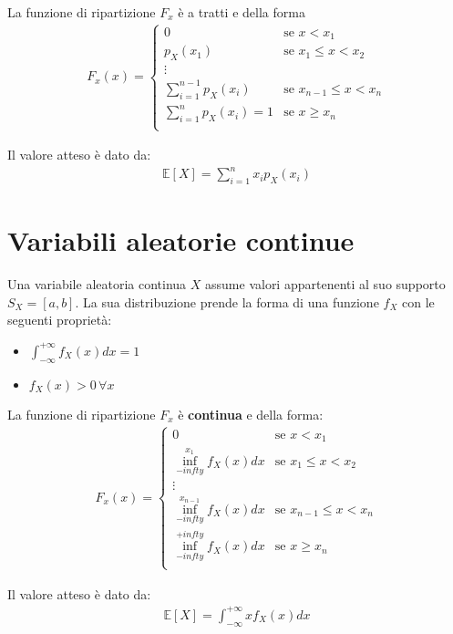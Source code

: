 \documentclass{article}
\begin{document}
La funzione di ripartizione $F_x$ \`e a tratti e della forma
\begin{align*}
F_x(x) = \begin{cases}
0 &\text{se } x < x_1 \\
p_X(x_1) &\text{se } x_1 \leq x < x_2 \\
\vdots \\
\sum_{i=1}^{n-1} p_X(x_i) &\text{se } x_{n-1} \leq x < x_{n} \\
\sum_{i=1}^n p_X(x_i) = 1 &\text{se } x \geq x_n \\
\end{cases}
\end{align*}

Il valore atteso \`e dato da:
\begin{align*}
\mathbb{E}[X] = \sum_{i=1}^n x_i p_X(x_i)
\end{align*}

\section{Variabili aleatorie continue}

Una variabile aleatoria continua $X$ assume valori appartenenti al suo supporto $S_X = [a, b]$.
La sua distribuzione prende la forma di una funzione $f_X$ con le seguenti propriet\`a:
\begin{itemize}
\item $\int_{-\infty}^{+\infty}f_X(x) dx = 1$
\item $f_X(x) > 0 \, \forall x$
\end{itemize}

La funzione di ripartizione $F_x$ \`e \textbf{continua} e della forma:
\begin{align*}
F_x(x) = \begin{cases}
0 &\text{se } x < x_1 \\
\inf_{-infty}^{x_1}f_X(x) dx &\text{se } x_1 \leq x < x_2 \\
\vdots \\
\inf_{-infty}^{x_{n-1}}f_X(x) dx &\text{se } x_{n-1} \leq x < x_n \\
\inf_{-infty}^{+infty}f_X(x) dx &\text{se } x \geq x_n \\
\end{cases}
\end{align*}

Il valore atteso \`e dato da:
\begin{align*}
\mathbb{E}[X] = \int_{-\infty}^{+\infty} x f_X(x) dx
\end{align*}
\end{document}
